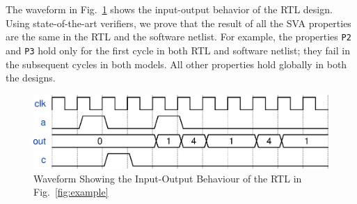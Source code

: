 The waveform in Fig.~\ref{intro-waveform} shows the input-output behavior of the RTL design. 
Using state-of-the-art verifiers, we prove that the result of all the SVA properties 
are the same in the RTL and the software netlist. For example, the properties \texttt{P2} and \texttt{P3} 
hold only for the first cycle in both RTL and software netlist; they fail in the 
subsequent cycles in both models.  All other properties 
hold globally in both the designs.
%
\begin{figure} 
\begin{center}
  \includegraphics[width=\columnwidth]{figures/example/waveform1.eps}%
	\caption{Waveform Showing the Input-Output Behaviour of the RTL in Fig.~\ref{fig:example}}
\label{intro-waveform}
\end{center}
\end{figure}
%
